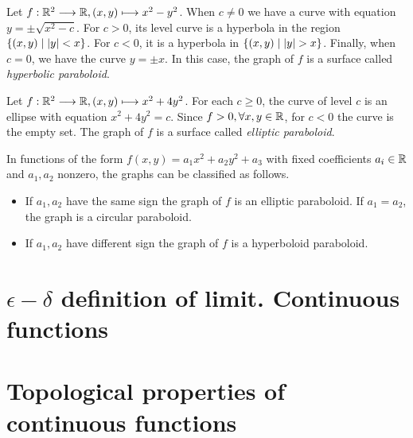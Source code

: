 \begin{example}
    Let $\appl{f}{\R^2}{\R}, (x, y)\longmapsto x^2 - y^2$. When $c\neq 0$ we have a curve with equation $y = \pm\sqrt{x^2 - c}$.
    For $c > 0$, its level curve is a hyperbola in the region $\{(x, y)\; | \; \abs{y} < x\}$. For $c < 0$, it is a hyperbola in
    $\{(x, y)\; | \;\abs{y} > x\}$. Finally, when $c = 0$, we have the curve $y = \pm x$. In this case, the graph of $f$ is a 
    surface called \textit{hyperbolic paraboloid}.
\end{example}

\begin{example}
    Let $\appl{f}{\R^2}{\R}, (x, y)\longmapsto x^2 + 4y^2$. For each $c\geq 0$, the curve of level $c$ is an ellipse with
    equation $x^2 + 4y^2 = c$. Since $f > 0, \forall x, y\in\R$, for $c < 0$ the curve is the empty set. The graph of $f$ is
    a surface called \textit{elliptic paraboloid}.
\end{example}

\begin{remark}
    In functions of the form $f(x, y) = a_1x^2 + a_2y^2 + a_3$ with fixed coefficients $a_i\in\R$ and $a_1, a_2$ nonzero, the
    graphs can be classified as follows.
    \begin{itemize}[itemsep = -2pt]
        \item If $a_1, a_2$ have the same sign the graph of $f$ is an elliptic paraboloid. If $a_1 = a_2$, the graph is a 
            circular paraboloid.
        \item If $a_1, a_2$ have different sign the graph of $f$ is a hyperboloid paraboloid.
    \end{itemize}
\end{remark}

\section{$\epsilon-\delta$ definition of limit. Continuous functions}
\section{Topological properties of continuous functions}
